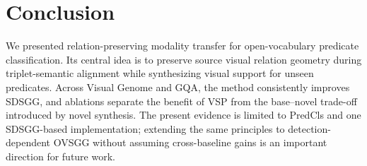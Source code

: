 \section{Conclusion}
\label{sec:conclusion}
We presented relation-preserving modality transfer for open-vocabulary
predicate classification. Its central idea is to preserve source visual
relation geometry during triplet-semantic alignment while synthesizing visual
support for unseen predicates. Across Visual Genome and GQA, the method
consistently improves SDSGG, and ablations separate the benefit of VSP from the
base--novel trade-off introduced by novel synthesis. The present evidence is
limited to PredCls and one SDSGG-based implementation; extending the same
principles to detection-dependent OVSGG without assuming cross-baseline gains
is an important direction for future work.
